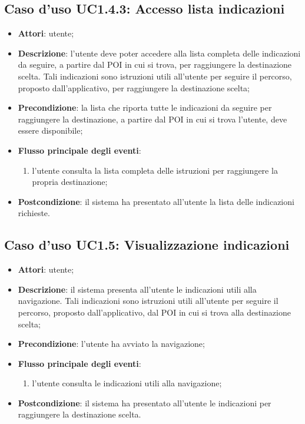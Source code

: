 \documentclass[../AnalisiDeiRequisiti.tex]{subfiles}
\begin{document}
\subsection{Caso d'uso UC1.4.3: Accesso lista indicazioni}
\begin{itemize}
\item \textbf{Attori}: utente;
\item \textbf{Descrizione}: l'utente deve poter accedere alla lista completa delle indicazioni da seguire, a partire dal POI in cui si trova, per raggiungere la destinazione scelta. Tali indicazioni sono istruzioni utili all'utente per seguire il percorso, proposto dall'applicativo, per raggiungere la destinazione scelta; 
      \item \textbf{Precondizione}: la lista che riporta tutte le indicazioni da seguire per raggiungere la destinazione, a partire dal POI in cui si trova l'utente, deve essere disponibile;

        \item \textbf{Flusso principale degli eventi}:
          \begin{enumerate}
          \item l'utente consulta la lista completa delle istruzioni per raggiungere la propria destinazione;

      \end{enumerate}
    \item \textbf{Postcondizione}: il sistema ha presentato all'utente la lista delle indicazioni richieste.
  \end{itemize}
\hypertarget{UC1.5}{}
\subsection{Caso d'uso UC1.5: Visualizzazione indicazioni}
\begin{itemize}
\item \textbf{Attori}: utente;
\item \textbf{Descrizione}: il sistema presenta all'utente le indicazioni utili alla navigazione. Tali indicazioni sono istruzioni utili all'utente per seguire il percorso, proposto dall'applicativo, dal POI in cui si trova alla destinazione scelta; 
      \item \textbf{Precondizione}: l'utente ha avviato la navigazione;

        \item \textbf{Flusso principale degli eventi}:
          \begin{enumerate}
          \item l'utente consulta le indicazioni utili alla navigazione;

      \end{enumerate}
    \item \textbf{Postcondizione}: il sistema ha presentato all'utente le indicazioni per raggiungere la destinazione scelta.
  \end{itemize}
\hypertarget{UC1.6}{}
\end{document}

